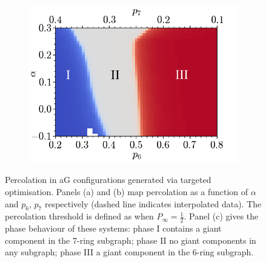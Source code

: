 \begin{figure}[bt]
      \begin{subfigure}[b]{0.5\textwidth}
         \centering
         \includegraphics[width=\textwidth]{./figures/targeted_opt/perc3.pdf}
         \caption{}
         \label{fig:percres3}
     \end{subfigure}
     \hfill
     
     \caption{Percolation in aG configurations generated via targeted optimisation. Panels (a) and (b) map percolation as a function of $\alpha$ and $p_6$, $p_7$ respectively (dashed line indicates interpolated data). The percolation threshold is defined as when $P_\infty=\frac{1}{2}$. Panel (c) gives the phase behaviour of these systems: phase I contains a giant component in the 7\--ring subgraph; phase II no giant components in any subgraph; phase III a giant component in the 6\--ring subgraph.}
     \label{fig:percolationres}
\end{figure}

